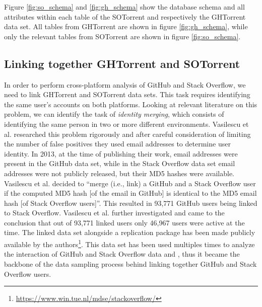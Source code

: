         
        Figure \ref{fig:so_schema} and \ref{fig:gh_schema} show the database schema and all attributes within each table of the SOTorrent and respectively the GHTorrent data set. All tables from GHTorrent are shown in figure \ref{fig:gh_schema}, while only the relevant tables from SOTorrent are shown in figure \ref{fig:so_schema}. 


    \subsection{Linking together GHTorrent and SOTorrent}\label{Linking_SO_GH}
    
        In order to perform cross-platform analysis of GitHub and Stack Overflow,  we need to link  GHTorrent and SOTorrent data sets. This task requires identifying the same user's accounts on both platforms. Looking at relevant literature on this problem, we can identify the task of \textit{identity merging}, which consists of identifying the same person in two or more different environments. Vasilescu et al. \cite{vasilescu2013stackoverflow} researched this problem rigorously and after careful consideration of limiting the number of false positives they used email addresses to determine user identity. In 2013, at the time of publishing their work, email addresses were present in the GitHub data set, while in the Stack Overflow data set email addresses were not publicly released, but their MD5 hashes were available. Vasilescu et al. \cite{vasilescu2013stackoverflow} decided to ``merge (i.e., link) a GitHub and a Stack Overflow user if the computed MD5 hash [of the email in GitHub] is identical to the MD5 email hash [of Stack Overflow users]''. This resulted in 93,771 GitHub users being linked to Stack Overflow. Vasilescu et al. \cite{vasilescu2013stackoverflow} further investigated and came to the conclusion that out of 93,771 linked users only 46,967 users were active at the time. The linked data set alongside a replication package has been made publicly available by the authors\footnote{\label{bodgan_dataset}\url{https://www.win.tue.nl/mdse/stackoverflow/}}. This data set has been used multiples times to analyze the interaction of GitHub and Stack Overflow data \cite{badashian2014involvement} and \cite{lee2017github}, thus it became the backbone of the data sampling process behind linking together GitHub and Stack Overflow users.  

